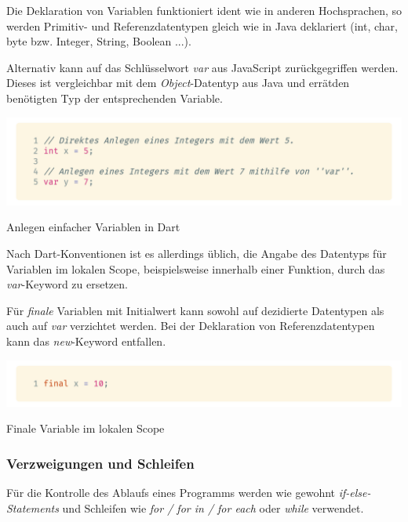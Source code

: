 Die Deklaration von Variablen funktioniert ident wie in anderen Hochsprachen, so werden Primitiv- und Referenzdatentypen gleich wie in Java deklariert (int, char, byte bzw. Integer, String, Boolean ...).

Alternativ kann auf das Schlüsselwort \textit{var} aus JavaScript zurückgegriffen werden. Dieses ist vergleichbar mit dem \textit{Object}-Datentyp aus Java und \glqq errät\grqq\space den benötigten Typ der entsprechenden Variable.

\begin{code}[h]
    \centering
    \includegraphics[width=1\textwidth]{images/Dart/theory/dartVariables.png}
    \vspace{-25pt}
    \caption{Anlegen einfacher Variablen in Dart}
\end{code}

Nach Dart-Konventionen ist es allerdings üblich, die Angabe des Datentyps für Variablen im lokalen Scope, beispielsweise innerhalb einer Funktion, durch das \textit{var}-Keyword zu ersetzen. \cite{dartdesignvariables2021}

Für \textit{finale} Variablen mit Initialwert kann sowohl auf dezidierte Datentypen als auch auf \textit{var} verzichtet werden. Bei der Deklaration von Referenzdatentypen kann das \textit{new}-Keyword entfallen.

\begin{code}[h]
    \centering
    \includegraphics[width=1\textwidth]{images/Dart/theory/dartLocalFinal.png}
    \vspace{-25pt}
    \caption{Finale Variable im lokalen Scope}
\end{code}

\subsubsection{Verzweigungen und Schleifen}

Für die Kontrolle des Ablaufs eines Programms werden wie gewohnt \textit{if-else-Statements} und Schleifen
wie \textit{for / for in / for each} oder \textit{while} verwendet.

